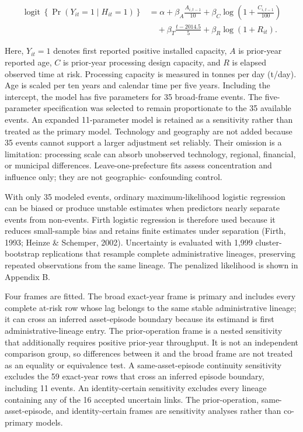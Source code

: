 \documentclass[12pt,letterpaper]{article}
\begin{document}
\begin{equation}
\begin{aligned}
\operatorname{logit}\!\left\{\Pr(Y_{it}=1\mid H_{it}=1)\right\}
&=\alpha+\beta_A\frac{A_{i,t-1}}{10}
+\beta_C\log\!\left(1+\frac{C_{i,t-1}}{100}\right) \\
&\quad+\beta_T\frac{t-2014.5}{5}
+\beta_R\log(1+R_{it}).
\end{aligned}
\label{eq:entry-model}
\end{equation}

Here, $Y_{it}=1$ denotes first reported positive installed capacity, $A$ is
prior-year reported age, $C$ is prior-year processing design capacity, and
$R$ is elapsed observed time at risk. Processing capacity is measured in tonnes
per day (t/day). Age is scaled per ten years and calendar time per five years.
Including the intercept, the model has five
parameters for 35 broad-frame events. The five-parameter specification was selected to remain proportionate to the 35 available events. An expanded 11-parameter model is retained as a sensitivity rather than treated as the primary model. Technology and geography
are not added because 35 events cannot support a larger adjustment set reliably.
Their omission is a limitation: processing scale can absorb unobserved
technology, regional, financial, or municipal differences. Leave-one-prefecture
fits assess concentration and influence only; they are not geographic-
confounding control.

With only 35 modeled events, ordinary maximum-likelihood logistic regression can be biased or produce unstable estimates when predictors nearly separate events from non-events. Firth logistic regression is therefore used because it reduces small-sample bias and retains finite estimates under separation (Firth, 1993; Heinze \& Schemper, 2002). Uncertainty is evaluated with 1,999 cluster-bootstrap replications that resample complete administrative lineages, preserving repeated observations from the same lineage. The penalized likelihood is shown in Appendix B.

Four frames are fitted. The broad exact-year frame is primary and includes every complete
at-risk row whose lag belongs to the same stable administrative lineage; it can
cross an inferred asset-episode boundary because its estimand is first
administrative-lineage entry. The prior-operation frame is a nested sensitivity
that additionally requires positive prior-year throughput. It is not an
independent comparison group, so differences between it and the broad frame are
not treated as an equality or equivalence test. A same-asset-episode continuity
sensitivity excludes the 59 exact-year rows that cross an inferred episode
boundary, including 11 events. An identity-certain sensitivity excludes every
lineage containing any of the 16 accepted uncertain links. The prior-operation,
same-asset-episode, and identity-certain frames are sensitivity analyses rather
than co-primary models.
\end{document}
